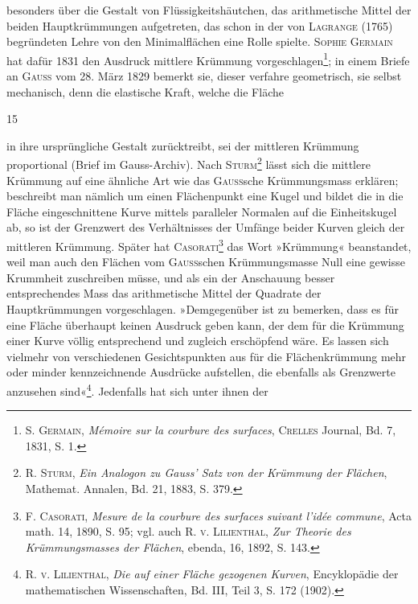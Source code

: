besonders über die Gestalt von Flüssigkeitshäutchen, das arithmetische Mittel
der beiden Hauptkrümmungen aufgetreten, das schon in der von \textsc{Lagrange}
(1765) begründeten Lehre von den Minimalflächen eine Rolle spielte. \textsc{Sophie
Germain} hat dafür 1831 den Ausdruck mittlere Krümmung vorgeschlagen\footnote{\textsc{S. Germain}, \textit{Mémoire sur la courbure des surfaces}, \textsc{Crelles} Journal, Bd. 7, 1831, S. 1.};
in einem Briefe an \textsc{Gauss} vom 28. März 1829 bemerkt sie, dieser verfahre
geometrisch, sie selbst mechanisch, denn die elastische Kraft, welche die Fläche
\par\smallskip{}\hfill{\small 15}\par
\clearpage{}\setcounter{footnote}{0}
\noindent in ihre ursprüngliche Gestalt zurücktreibt, sei der mittleren Krümmung proportional
(Brief im Gauss-Archiv). Nach \textsc{Sturm}\footnote{\textsc{R. Sturm}, \textit{Ein Analogon zu Gauss’ Satz von der Krümmung der Flächen}, Mathemat. Annalen, Bd. 21, 1883, S. 379.} lässt sich die mittlere
Krümmung auf eine ähnliche Art wie das \textsc{Gauss}sche Krümmungsmass erklären;
beschreibt man nämlich um einen Flächenpunkt eine Kugel und bildet
die in die Fläche eingeschnittene Kurve mittels paralleler Normalen auf die
Einheitskugel ab, so ist der Grenzwert des Verhältnisses der Umfänge beider
Kurven gleich der mittleren Krümmung. Später hat \textsc{Casorati}\footnote{\textsc{F. Casorati}, \textit{Mesure de la courbure des surfaces suivant l’idée commune}, Acta math. 14, 1890, S. 95; vgl. auch \textsc{R. v. Lilienthal}, \textit{Zur Theorie des Krümmungsmasses der Flächen}, ebenda, 16, 1892, S. 143.} das Wort
»Krümmung« beanstandet, weil man auch den Flächen vom \textsc{Gauss}schen Krümmungsmasse
Null eine gewisse Krummheit zuschreiben müsse, und als ein der
Anschauung besser entsprechendes Mass das arithmetische Mittel der Quadrate
der Hauptkrümmungen vorgeschlagen. »Demgegenüber ist zu bemerken, dass
es für eine Fläche überhaupt keinen Ausdruck geben kann, der dem für die
Krümmung einer Kurve völlig entsprechend und zugleich erschöpfend wäre.
Es lassen sich vielmehr von verschiedenen Gesichtspunkten aus für die Flächenkrümmung
mehr oder minder kennzeichnende Ausdrücke aufstellen, die ebenfalls
als Grenzwerte anzusehen sind«\footnote{\textsc{R. v. Lilienthal}, \textit{Die auf einer Fläche gezogenen Kurven}, Encyklopädie der mathematischen Wissenschaften, Bd. III, Teil 3, S. 172 (1902).}. Jedenfalls hat sich unter ihnen der
